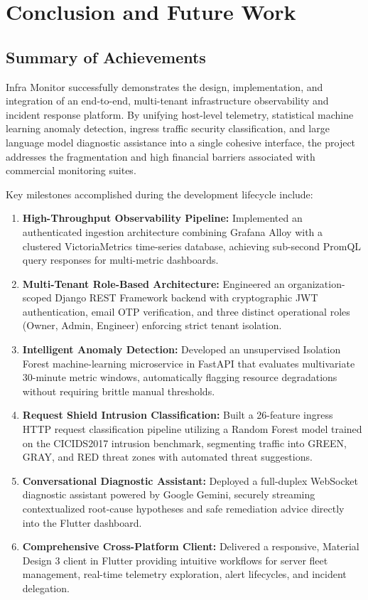 \chapter{Conclusion and Future Work}

\section{Summary of Achievements}
Infra Monitor successfully demonstrates the design, implementation, and integration of an end-to-end, multi-tenant infrastructure observability and incident response platform. By unifying host-level telemetry, statistical machine learning anomaly detection, ingress traffic security classification, and large language model diagnostic assistance into a single cohesive interface, the project addresses the fragmentation and high financial barriers associated with commercial monitoring suites.

Key milestones accomplished during the development lifecycle include:
\begin{enumerate}
  \item \textbf{High-Throughput Observability Pipeline:} Implemented an authenticated ingestion architecture combining Grafana Alloy with a clustered VictoriaMetrics time-series database, achieving sub-second PromQL query responses for multi-metric dashboards.
  
  \item \textbf{Multi-Tenant Role-Based Architecture:} Engineered an organization-scoped Django REST Framework backend with cryptographic JWT authentication, email OTP verification, and three distinct operational roles (Owner, Admin, Engineer) enforcing strict tenant isolation.
  
  \item \textbf{Intelligent Anomaly Detection:} Developed an unsupervised Isolation Forest machine-learning microservice in FastAPI that evaluates multivariate 30-minute metric windows, automatically flagging resource degradations without requiring brittle manual thresholds.
  
  \item \textbf{Request Shield Intrusion Classification:} Built a 26-feature ingress HTTP request classification pipeline utilizing a Random Forest model trained on the CICIDS2017 intrusion benchmark, segmenting traffic into GREEN, GRAY, and RED threat zones with automated threat suggestions.
  
  \item \textbf{Conversational Diagnostic Assistant:} Deployed a full-duplex WebSocket diagnostic assistant powered by Google Gemini, securely streaming contextualized root-cause hypotheses and safe remediation advice directly into the Flutter dashboard.
  
  \item \textbf{Comprehensive Cross-Platform Client:} Delivered a responsive, Material Design 3 client in Flutter providing intuitive workflows for server fleet management, real-time telemetry exploration, alert lifecycles, and incident delegation.
\end{enumerate}

